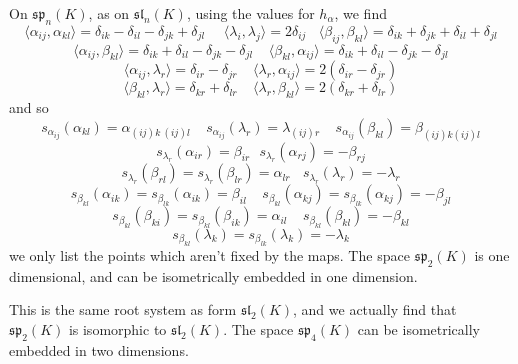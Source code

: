 \begin{example}
    On $\mathfrak{sp}_n(K)$, as on $\mathfrak{sl}_n(K)$, using the values for $h_\alpha$, we find
    \[ \langle \alpha_{ij}, \alpha_{kl} \rangle = \delta_{ik} - \delta_{il} - \delta_{jk} + \delta_{jl}\ \ \ \ \ \ \langle \lambda_i, \lambda_j \rangle = 2 \delta_{ij} \ \ \ \ \langle \beta_{ij}, \beta_{kl} \rangle = \delta_{ik} + \delta_{jk} + \delta_{il} + \delta_{jl} \]
    \[ \langle \alpha_{ij}, \beta_{kl} \rangle = \delta_{ik} + \delta_{il} - \delta_{jk} - \delta_{jl}\ \ \ \ \ \langle \beta_{kl}, \alpha_{ij} \rangle = \delta_{ik} + \delta_{il} - \delta_{jk} - \delta_{jl} \]
    \[ \langle \alpha_{ij}, \lambda_r \rangle = \delta_{ir} - \delta_{jr}\ \ \ \ \ \langle \lambda_r, \alpha_{ij} \rangle = 2(\delta_{ir} - \delta_{jr}) \]
    \[ \langle \beta_{kl}, \lambda_r \rangle = \delta_{kr} + \delta_{lr}\ \ \ \ \ \langle \lambda_r, \beta_{kl} \rangle = 2(\delta_{kr} + \delta_{lr}) \]
    and so
    \[ s_{\alpha_{ij}}(\alpha_{kl}) = \alpha_{(ij)k\ (ij)l}\ \ \ \ \ s_{\alpha_{ij}}(\lambda_r) = \lambda_{(ij) r}\ \ \ \ \ s_{\alpha_{ij}}(\beta_{kl}) = \beta_{(ij)k (ij)l} \]
    \[ s_{\lambda_r}(\alpha_{ir}) = \beta_{ir}\ \ \ s_{\lambda_r}(\alpha_{rj}) = -\beta_{rj} \]
    \[ s_{\lambda_r}(\beta_{rl}) = s_{\lambda_r}(\beta_{lr}) = \alpha_{lr}\ \ \ \ s_{\lambda_r}(\lambda_r) = -\lambda_r \]
    \[ s_{\beta_{kl}}(\alpha_{ik}) = s_{\beta_{lk}}(\alpha_{ik}) = \beta_{il}\ \ \ \ \ s_{\beta_{kl}}(\alpha_{kj}) = s_{\beta_{lk}}(\alpha_{kj}) = -\beta_{jl} \]
    \[ s_{\beta_{kl}}(\beta_{ki}) = s_{\beta_{kl}}(\beta_{ik}) = \alpha_{il}\ \ \ \ \ s_{\beta_{kl}}(\beta_{kl}) = -\beta_{kl} \]
    \[ s_{\beta_{kl}}(\lambda_k) = s_{\beta_{lk}}(\lambda_k) = -\lambda_k \]
    we only list the points which aren't fixed by the maps. The space $\mathfrak{sp}_2(K)$ is one dimensional, and can be isometrically embedded in one dimension.
    \begin{center}
    \end{center}
    This is the same root system as form $\mathfrak{sl}_2(K)$, and we actually find that $\mathfrak{sp}_2(K)$ is isomorphic to $\mathfrak{sl}_2(K)$. The space $\mathfrak{sp}_4(K)$ can be isometrically embedded in two dimensions.
    \begin{center}
\end{center}
\end{example}
